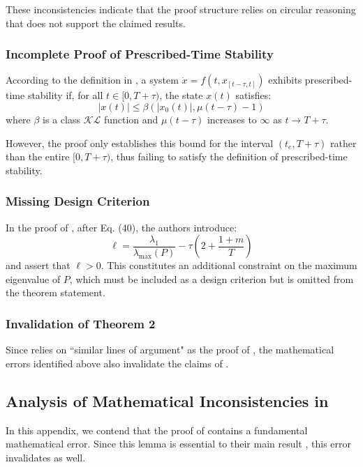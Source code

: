 \documentclass[journal]{IEEEtran}
\begin{document}
These inconsistencies indicate that the proof structure relies on circular reasoning that does not support the claimed results.

\subsubsection{Incomplete Proof of Prescribed-Time Stability}

According to the definition in \cite{Adil2024}, a system $\dot{x} = f(t,x_{[t-\tau,t]})$ exhibits prescribed-time stability if, for all $t \in [0, T+\tau)$, the state $x(t)$ satisfies:
\begin{equation}
    \label{eq-pt-stability-ref14}
    |x(t)| \leq \beta(|x_0(t)|,\mu(t-\tau)-1)
\end{equation}
where $\beta$ is a class $\mathcal{KL}$ function and $\mu(t-\tau)$ increases to $\infty$ as $t \to T+\tau$.

However, the proof only establishes this bound for the interval $(t_e,T+\tau)$ rather than the entire $[0,T+\tau)$, thus failing to satisfy the definition of prescribed-time stability.

\subsubsection{Missing Design Criterion}
In the proof of \cite[Theorem 1]{Adil2024}, after Eq. (40), the authors introduce:
\[
\ell = \frac{\lambda_1}{\lambda_{\max}(P)} - \tau \left(2 + \frac{1+m}{T} \right)
\]
and assert that $\ell > 0$. This constitutes an additional constraint on the maximum eigenvalue of $P$, which must be included as a design criterion but is omitted from the theorem statement.

\subsubsection{Invalidation of Theorem 2}
Since \cite[Theorem 2]{Adil2024} relies on ``similar lines of argument" as the proof of \cite[Theorem 1]{Adil2024}, the mathematical errors identified above also invalidate the claims of \cite[Theorem 2]{Adil2024}.

\subsection{Analysis of Mathematical Inconsistencies in \cite{Chang2021}}
\label{append:mistakes-chang2021}
In this appendix, we contend that the proof of \cite[Lemma 5]{Chang2021} contains a fundamental mathematical error. Since this lemma is essential to their main result \cite[Theorem 1]{Chang2021}, this error invalidates \cite[Theorem 1]{Chang2021} as well.
\end{document}
